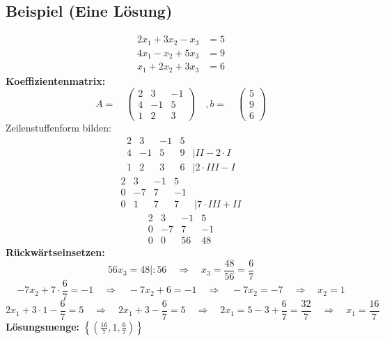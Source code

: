 \documentclass[12pt,a4paper]{article}
\begin{document}
\subsection{Beispiel (Eine Lösung)}
\begin{align*}
2x_1 + 3x_2 -x_3 &= 5 \\
4x_1 - x_2 + 5x_3 &= 9 \\
x_1 + 2x_2 + 3x_3 &= 6
\end{align*}
\textbf{Koeffizientenmatrix:}
\[
A =
\quad
\begin{pmatrix}
2 & 3 & -1 \\
4 & -1 & 5 \\
1 & 2 & 3
\end{pmatrix}
\quad
, b =
\quad
\begin{pmatrix}
5 \\
9 \\
6
\end{pmatrix}
\]
Zeilenstuffenform bilden:
\[
\begin{matrix}
2 & 3 & -1 & 5 \\
4 & -1 & 5 & 9 & \vert II - 2 \cdot I \\
1 & 2 & 3 & 6 & \vert 2 \cdot III - I
\end{matrix}
\]
\[
\begin{matrix}
2 & 3 & -1 & 5 \\
0 & -7 & 7 & -1 \\
0 & 1 & 7 & 7 & \vert 7 \cdot III + II
\end{matrix}
\]
\[
\begin{matrix}
2 & 3 & -1 & 5 \\
0 & -7 & 7 & -1 \\
0 & 0 & 56 & 48
\end{matrix}
\]
\textbf{Rückwärtseinsetzen:} \\
\[
    56x_3 = 48 \vert :56
    \quad \Rightarrow \quad
    x_3 = \frac{48}{56} = \frac{6}{7} 
\]
\[
-7x_2 + 7 \cdot \frac{6}{7} = -1 \quad \Rightarrow \quad -7x_2 + 6 = -1 \quad \Rightarrow \quad -7x_2 = -7 \quad \Rightarrow \quad x_2 = 1
\]
\[
2x_1 + 3 \cdot 1 - \frac{6}{7} = 5 \quad \Rightarrow \quad 2x_1 + 3 - \frac{6}{7} = 5 \quad \Rightarrow \quad 2x_1 = 5 - 3 + \frac{6}{7} = \frac{32}{7} \quad \Rightarrow \quad x_1 = \frac{16}{7}
\]
\textbf{Lösungsmenge:} $\left\{ \left( \frac{16}{7}, 1, \frac{6}{7} \right) \right\}$
\end{document}
